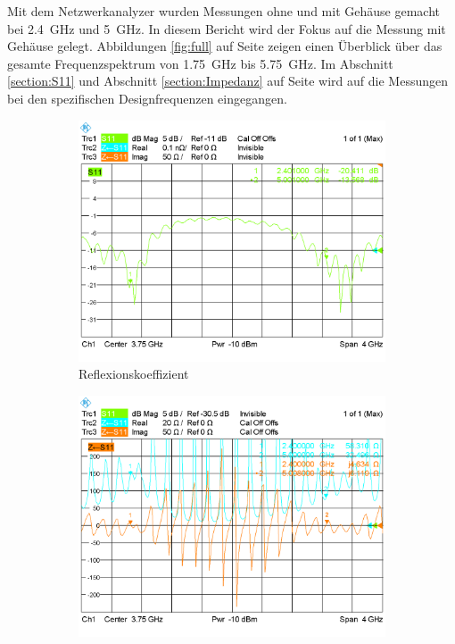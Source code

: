 \noindent Mit dem Netzwerkanalyzer wurden Messungen ohne und mit Gehäuse gemacht
bei \SI{2.4}{\giga\hertz} und \SI{5}{\giga\hertz}. In diesem Bericht
wird der Fokus auf die Messung mit Gehäuse gelegt. Abbildungen \ref{fig:full} auf Seite \pageref{fig:full} zeigen
einen Überblick über das gesamte Frequenzspektrum von
\SI{1.75}{\giga\hertz} bis \SI{5.75}{\giga\hertz}. Im Abschnitt \ref{section:S11} und
Abschnitt \ref{section:Impedanz} auf Seite \pageref{section:Impedanz} wird auf die Messungen bei den spezifischen Designfrequenzen
eingegangen.

\begin{figure}[h!]
	\begin{center}
		\begin{subfigure}[t]{0.49\textwidth}
			\begin{center}
				\includegraphics[width=1\textwidth]{../fig/plt/S11_WITH_FULL.PNG}
				\caption{Reflexionskoeffizient}
				\label{fig:S11_with_full}
			\end{center}
		\end{subfigure}
		\begin{subfigure}[t]{0.49\textwidth}
			\begin{center}
				\includegraphics[width=1\textwidth]{../fig/plt/IMP_WITH_FULL.PNG}

\end{center}
\end{subfigure}
\end{center}
\end{figure}
